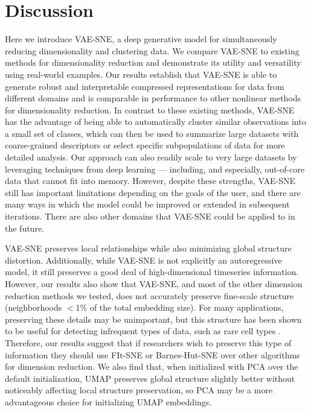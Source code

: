 \section{Discussion}
Here we introduce VAE-SNE, a deep generative model for simultaneously reducing dimensionality and clustering data. We compare VAE-SNE to existing methods for dimensionality reduction and demonstrate its utility and versatility using real-world examples. Our results establish that VAE-SNE is able to generate robust and interpretable compressed representations for data from different domains and is comparable in performance to other nonlinear methods for dimensionality reduction. In contrast to these existing methods, VAE-SNE has the advantage of being able to automatically cluster similar observations into a small set of classes, which can then be used to summarize large datasets with coarse-grained descriptors or select specific subpopulations of data for more detailed analysis. Our approach can also readily scale to very large datasets by leveraging techniques from deep learning --- including, and especially, out-of-core data that cannot fit into memory. However, despite these strengths, VAE-SNE still has important limitations depending on the goals of the user, and there are many ways in which the model could be improved or extended in subsequent iterations. There are also other domains that VAE-SNE could be applied to in the future.

VAE-SNE preserves local relationships while also minimizing global structure distortion. Additionally, while VAE-SNE is not explicitly an autoregressive model, it still preserves a good deal of high-dimensional timeseries information. However, our results also show that VAE-SNE, and most of the other dimension reduction methods we tested, does not accurately preserve fine-scale structure (neighborhoods $<$1\% of the total embedding size). For many applications, preserving these details may be unimportant, but this structure has been shown to be useful for detecting infrequent types of data, such as rare cell types \citep{linderman2019fast}. Therefore, our results suggest that if researchers wish to preserve this type of information they should use FIt-SNE \citep{linderman2017efficient, linderman2019fast} or Barnes-Hut-SNE \citep{van2014accelerating} over other algorithms for dimension reduction. We also find that, when initialized with PCA over the default initialization, UMAP \citep{mcinnes2018umap} preserves global structure slightly better without noticeably affecting local structure preservation, so PCA may be a more advantageous choice for initializing UMAP embeddings.

